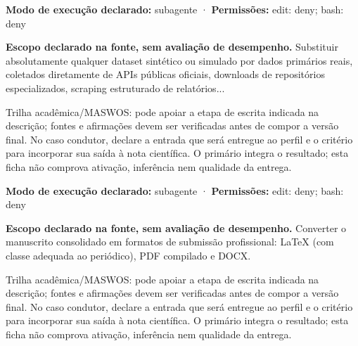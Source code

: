 \begin{arquitetura}
\textbf{Modo de execução declarado:} subagente · \textbf{Permissões:} edit: deny; bash: deny
\end{arquitetura}


\begin{descricao}
\textbf{Escopo declarado na fonte, sem avaliação de desempenho.}
Substituir absolutamente qualquer dataset sintético ou simulado por dados primários reais, coletados diretamente de APIs públicas oficiais, downloads de repositórios especializados, scraping estruturado de relatórios...
\end{descricao}

\begin{funcao}
Trilha acadêmica/MASWOS: pode apoiar a etapa de escrita indicada na descrição; fontes e afirmações devem ser verificadas antes de compor a versão final. No caso condutor, declare a entrada que será entregue ao perfil e o critério para incorporar sua saída à nota científica. O primário integra o resultado; esta ficha não comprova ativação, inferência nem qualidade da entrega.
\end{funcao}

\begin{arquitetura}
\textbf{Modo de execução declarado:} subagente · \textbf{Permissões:} edit: deny; bash: deny
\end{arquitetura}


\begin{descricao}
\textbf{Escopo declarado na fonte, sem avaliação de desempenho.}
Converter o manuscrito consolidado em formatos de submissão profissional: LaTeX (com classe adequada ao periódico), PDF compilado e DOCX.
\end{descricao}

\begin{funcao}
Trilha acadêmica/MASWOS: pode apoiar a etapa de escrita indicada na descrição; fontes e afirmações devem ser verificadas antes de compor a versão final. No caso condutor, declare a entrada que será entregue ao perfil e o critério para incorporar sua saída à nota científica. O primário integra o resultado; esta ficha não comprova ativação, inferência nem qualidade da entrega.
\end{funcao}

